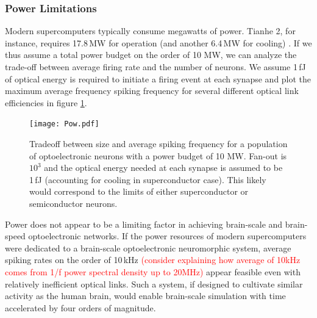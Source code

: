 \documentclass[twocolumn]{article}
\begin{document}
\subsubsection{Power Limitations}
Modern supercomputers typically consume megawatts of power. Tianhe 2, for instance, requires 17.8\,MW for operation (and another 6.4\,MW for cooling) \cite{tolpygo2016superconductor}. If we thus assume a total power budget on the order of 10 MW, we can analyze the trade-off between average firing rate and the number of neurons. We assume 1\,fJ of optical energy is required to initiate a firing event at each synapse and plot the maximum average frequency spiking frequency for several different optical link efficiencies in figure \ref{fig:freq_size}.
\begin{figure}[H]
    \centering
    \texttt{[image: Pow.pdf]}
    \caption{Tradeoff between size and average spiking frequency for a population of optoelectronic neurons with a power budget of 10 MW. Fan-out is $10^3$ and the optical energy needed at each synapse is assumed to be 1\,fJ (accounting for cooling in superconductor case). This likely would correspond to the limits of either superconductor or semiconductor neurons.}
    \label{fig:freq_size}
\end{figure}

Power does not appear to be a limiting factor in achieving brain-scale and brain-speed optoelectronic networks. If the power resources of modern supercomputers were dedicated to a brain-scale optoelectronic neuromorphic system, average spiking rates on the order of 10\,kHz \textcolor{red}{(consider explaining how average of 10kHz comes from 1/f power spectral density up to 20MHz)} appear feasible even with relatively inefficient optical links. Such a system, if designed to cultivate similar activity as the human brain, would enable brain-scale simulation with time accelerated by four orders of magnitude.
\end{document}
